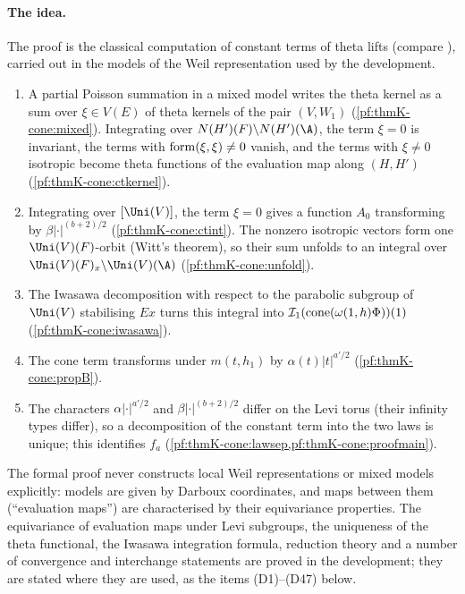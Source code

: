 \paragraph{The idea.}
The proof is the classical computation of constant terms of theta lifts (compare \cite{Rallis1984,KudlaRallis1994}),
carried out in the models of the Weil representation used by the development.
\begin{enumerate}
\item A partial Poisson summation in a mixed model writes the theta kernel as a sum over $\xi\in V(E)$ of theta
  kernels of the pair $(V,W_1)$ (\cref{pf:thmK-cone:mixed}).  Integrating over $N(H')(F)\backslash N(H')(\A)$, the
  term $\xi=0$ is invariant, the terms with $\operatorname{form}(\xi,\xi)\neq0$ vanish, and the terms with $\xi\neq0$
  isotropic become theta functions of the evaluation map along $(H,H')$
  (\cref{pf:thmK-cone:ctkernel}).
\item Integrating over $[\Uni(V)]$, the term $\xi=0$ gives a function $A_0$ transforming by $\beta|\cdot|^{(b+2)/2}$
  (\cref{pf:thmK-cone:ctint}).  The nonzero isotropic vectors form one $\Uni(V)(F)$-orbit (Witt's theorem), so their
  sum unfolds to an integral over $\Uni(V)(F)_x\backslash\Uni(V)(\A)$ (\cref{pf:thmK-cone:unfold}).
\item The Iwasawa decomposition with respect to the parabolic subgroup of $\Uni(V)$ stabilising $Ex$ turns this
  integral into $\mathcal{I}_1(\operatorname{cone}(\omega(1,h)\Phi))(1)$ (\cref{pf:thmK-cone:iwasawa}).
\item The cone term transforms under $m(t,h_1)$ by $\alpha(t)|t|^{a'/2}$ (\cref{pf:thmK-cone:propB}).
\item The characters $\alpha|\cdot|^{a'/2}$ and $\beta|\cdot|^{(b+2)/2}$ differ on the Levi torus (their
  infinity types differ), so a decomposition of the constant term into the two laws is unique; this identifies
  $f_a$ (\cref{pf:thmK-cone:lawsep,pf:thmK-cone:proofmain}).
\end{enumerate}
The formal proof never constructs local Weil representations or mixed models explicitly: models are given by
Darboux coordinates, and maps between them (``evaluation maps'') are characterised by their equivariance
properties.  The equivariance of evaluation maps under Levi subgroups, the uniqueness of the theta functional, the
Iwasawa integration formula, reduction theory and a number of convergence and interchange statements are proved in
the development; they are stated where they are used, as the items \textup{(D1)}--\textup{(D47)} below.

